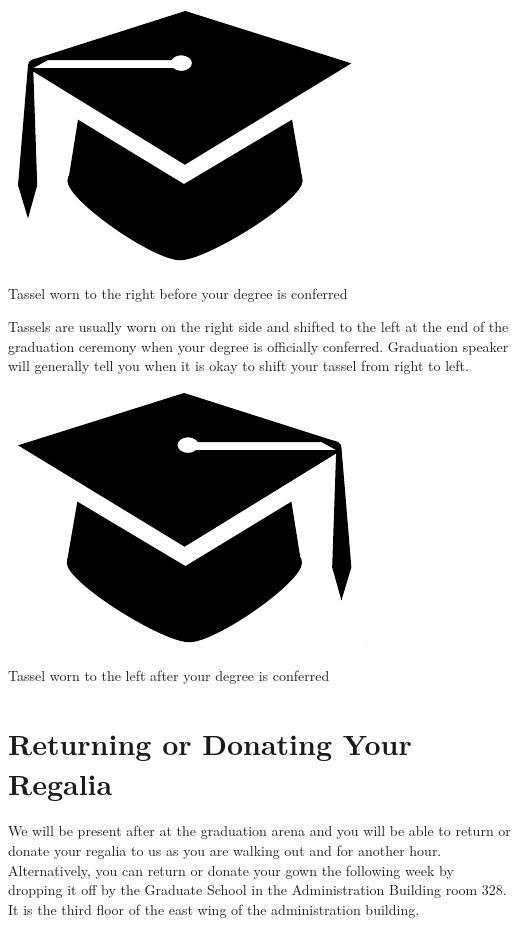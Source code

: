 \documentclass{tufte-handout}
\begin{document}
\begin{marginfigure}[\baselineskip]%
\hspace*{0.02in}
  \includegraphics[width=.45\linewidth]{capbwR}
  \caption{\linespread{1.3}\selectfont{}Tassel worn to the right before your degree is conferred}
  \label{fig:cap-right}
\end{marginfigure}

Tassels are usually worn on the right side and shifted to the left at the end of the graduation ceremony when your degree is officially conferred. Graduation speaker will generally tell you when it is okay to shift your tassel from right to left.

\begin{marginfigure}[\baselineskip]%
\hspace*{0.02in}
  \includegraphics[width=.45\linewidth]{capbwL}
  \caption{\linespread{1.3}\selectfont{}Tassel worn to the left after your degree is conferred}
  \label{fig:cap-left}
\end{marginfigure}


\section{Returning or Donating Your Regalia}
We will be present after at the graduation arena and you will be able to return or donate your regalia to us as you are walking out and for another hour.  Alternatively, you can return or donate your gown the following week by dropping it off by the Graduate School in the Administration Building room 328. It is the third floor of the east wing of the administration building.
\end{document}
